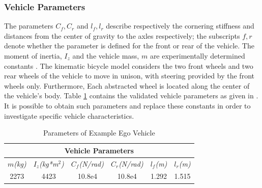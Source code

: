 \documentclass{easychair}
\theoremstyle{theorem}
\theoremstyle{remark}
\begin{document}
\subsubsection{Vehicle Parameters}
The parameters \(C_f,C_r\) and \(l_f, l_r\) describe respectively the cornering stiffness and distances from the center of gravity to the axles respectively; the subscripts $f,r$ denote whether the parameter is defined for the front or rear of the vehicle. The moment of inertia, \(I_z\) and the vehicle mass, \(m\) are experimentally determined constants \cite{Snider2009}. 
The kinematic bicycle model considers the two front wheels and two rear wheels of the vehicle to move in unison, with steering provided by the front wheels only. Furthermore, Each abstracted wheel is located along the center of the vehicle's body. Table \ref{table:vehiclep} contains the validated vehicle parameters as given in \cite{Althoff2014}. It is possible to obtain such parameters and replace these constants in order to investigate specific vehicle characteristics. 

\begin{table}[h]
	\centering
	\caption{Parameters of Example Ego Vehicle \cite{Althoff2014}}
	\label{table:vehiclep}
	\begin{tabular}{|c|c|c|c|c|c|}
		\hline
		\multicolumn{6}{|c|}{Vehicle Parameters} \\ \hline
		\textit{$m$(kg)} & \textit{$I_z$(kg*m$^2$)} & \textit{$C_f$(N/rad)} & \textit{$C_r$(N/rad)} & \textit{$l_f$(m)} & \textit{$l_r$(m)} \\ \hline
		2273 & 4423 & 10.8e4 & 10.8e4 & 1.292 & 1.515 \\ \hline
	\end{tabular}	
\end{table}
\end{document}
